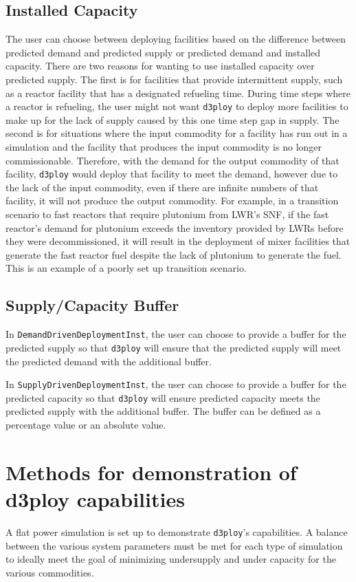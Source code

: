 \documentclass[11pt,letterpaper]{article}
\newcommand{\deploy}{\texttt{d3ploy}\xspace}%
\begin{document}
\subsection{Installed Capacity}
The user can choose between deploying facilities based on the difference 
between predicted demand and predicted supply or predicted demand and 
installed capacity. 
There are two reasons for wanting to use installed capacity over predicted 
supply. 
The first is for facilities that provide intermittent supply, such as a 
reactor facility that has a designated refueling time. 
During time steps where a reactor is refueling, the user might not 
want \deploy to deploy more facilities to make up for the lack of supply
caused by this one time step gap in supply. 
The second is for situations where the input commodity for a facility has
run out in a simulation and the facility that produces the input commodity 
is no longer commissionable. 
Therefore, with the demand for the output commodity of that facility, \deploy
would deploy that facility to meet the demand, however due to the lack of 
the input commodity, even if there are infinite numbers of that facility, 
it will not produce the output commodity. 
For example, in a transition scenario to fast reactors that require plutonium 
from \gls{LWR}'s \gls{SNF}, if the fast reactor's demand for plutonium exceeds
the inventory provided by \gls{LWR}s before they were decommissioned, it will 
result in the deployment of mixer facilities that generate the fast reactor 
fuel despite the lack of plutonium to generate the fuel. 
This is an example of a poorly set up transition scenario. 

\subsection{Supply/Capacity Buffer}
In \texttt{DemandDrivenDeploymentInst}, the user can choose to provide a
buffer for the predicted supply so that \deploy will ensure that the predicted 
supply will meet the predicted demand with the additional buffer. 

In \texttt{SupplyDrivenDeploymentInst}, the user can choose to provide a
buffer for the predicted capacity so that \deploy will ensure predicted 
capacity meets the predicted supply with the additional buffer. 
The buffer can be defined as a percentage value or an absolute value.  

\section{Methods for demonstration of d3ploy capabilities}
A flat power simulation is set up to demonstrate \deploy's 
capabilities. 
A balance between the various system parameters must be 
met for each type of simulation to ideally meet the goal of 
minimizing undersupply and under capacity for the various 
commodities. 
\end{document}
